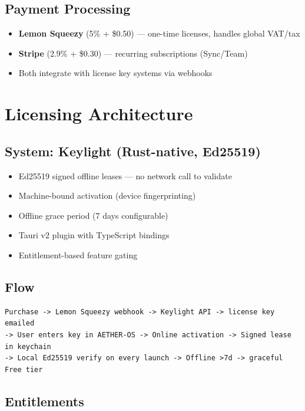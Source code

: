 \documentclass[11pt,a4paper]{article}
\begin{document}
\subsection{Payment Processing}

\begin{itemize}[noitemsep]
  \item \textbf{Lemon Squeezy} (5\% + \$0.50) --- one-time licenses, handles global VAT/tax
  \item \textbf{Stripe} (2.9\% + \$0.30) --- recurring subscriptions (Sync/Team)
  \item Both integrate with license key systems via webhooks
\end{itemize}

\section{Licensing Architecture}

\subsection{System: Keylight (Rust-native, Ed25519)}

\begin{itemize}[noitemsep]
  \item Ed25519 signed offline leases --- no network call to validate
  \item Machine-bound activation (device fingerprinting)
  \item Offline grace period (7 days configurable)
  \item Tauri v2 plugin with TypeScript bindings
  \item Entitlement-based feature gating
\end{itemize}

\subsection{Flow}

\begin{verbatim}
Purchase -> Lemon Squeezy webhook -> Keylight API -> license key emailed
-> User enters key in AETHER-OS -> Online activation -> Signed lease in keychain
-> Local Ed25519 verify on every launch -> Offline >7d -> graceful Free tier
\end{verbatim}

\subsection{Entitlements}
\end{document}
